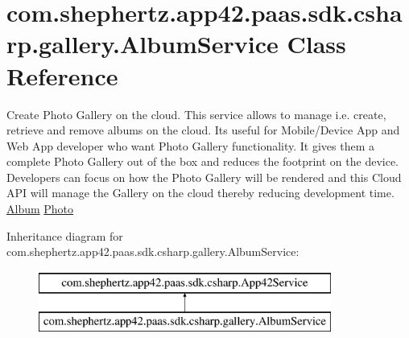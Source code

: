 \hypertarget{classcom_1_1shephertz_1_1app42_1_1paas_1_1sdk_1_1csharp_1_1gallery_1_1_album_service}{\section{com.\+shephertz.\+app42.\+paas.\+sdk.\+csharp.\+gallery.\+Album\+Service Class Reference}
\label{classcom_1_1shephertz_1_1app42_1_1paas_1_1sdk_1_1csharp_1_1gallery_1_1_album_service}
}


Create Photo Gallery on the cloud. This service allows to manage i.\+e. create, retrieve and remove albums on the cloud. Its useful for Mobile/\+Device App and Web App developer who want Photo Gallery functionality. It gives them a complete Photo Gallery out of the box and reduces the footprint on the device. Developers can focus on how the Photo Gallery will be rendered and this Cloud A\+P\+I will manage the Gallery on the cloud thereby reducing development time. \hyperlink{}{Album} \hyperlink{}{Photo}  


Inheritance diagram for com.\+shephertz.\+app42.\+paas.\+sdk.\+csharp.\+gallery.\+Album\+Service\+:\begin{figure}[H]
\begin{center}
\leavevmode
\includegraphics[height=2.000000cm]{classcom_1_1shephertz_1_1app42_1_1paas_1_1sdk_1_1csharp_1_1gallery_1_1_album_service}
\end{center}
\end{figure}
